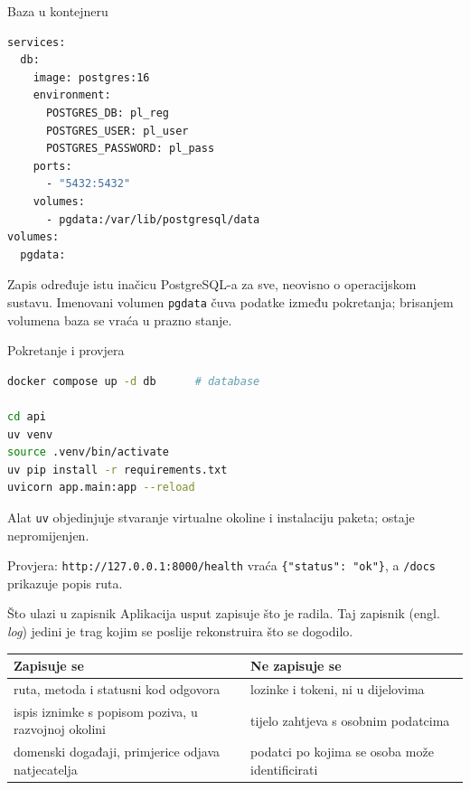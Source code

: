 \begin{frame}[fragile]{Baza u kontejneru}
\begin{lstlisting}[language=bash]
services:
  db:
    image: postgres:16
    environment:
      POSTGRES_DB: pl_reg
      POSTGRES_USER: pl_user
      POSTGRES_PASSWORD: pl_pass
    ports:
      - "5432:5432"
    volumes:
      - pgdata:/var/lib/postgresql/data
volumes:
  pgdata:
\end{lstlisting}

\vspace{0.3em}
Zapis određuje istu inačicu PostgreSQL-a za sve, neovisno o operacijskom sustavu. Imenovani volumen \texttt{pgdata} čuva podatke između pokretanja; brisanjem volumena baza se vraća u prazno stanje.
\end{frame}

\begin{frame}[fragile]{Pokretanje i provjera}
\begin{lstlisting}[language=bash]
docker compose up -d db      # database

cd api
uv venv
source .venv/bin/activate
uv pip install -r requirements.txt
uvicorn app.main:app --reload
\end{lstlisting}

\vspace{0.4em}
Alat \texttt{uv} objedinjuje stvaranje virtualne okoline i instalaciju paketa;  ostaje nepromijenjen.

\vspace{0.3em}
Provjera: \texttt{http://127.0.0.1:8000/health} vraća \texttt{\{"status": "ok"\}}, a \texttt{/docs} prikazuje popis ruta.
\end{frame}


\begin{frame}{Što ulazi u zapisnik}
Aplikacija usput zapisuje što je radila. Taj zapisnik (engl. \emph{log}) jedini je trag kojim se poslije rekonstruira što se dogodilo.

\vspace{0.8em}
{\small
\setlength{\tabcolsep}{6pt}
\renewcommand{\arraystretch}{1.5}
\begin{tabular}{@{}L{5.6cm}L{5.6cm}@{}}
  \toprule
  \textbf{Zapisuje se} & \textbf{Ne zapisuje se} \\
  \midrule
  ruta, metoda i statusni kod odgovora & lozinke i tokeni, ni u dijelovima \\
  ispis iznimke s popisom poziva, u razvojnoj okolini & tijelo zahtjeva s osobnim podatcima \\
  domenski događaji, primjerice odjava natjecatelja & podatci po kojima se osoba može identificirati \\
  \bottomrule
\end{tabular}
}
\end{frame}

